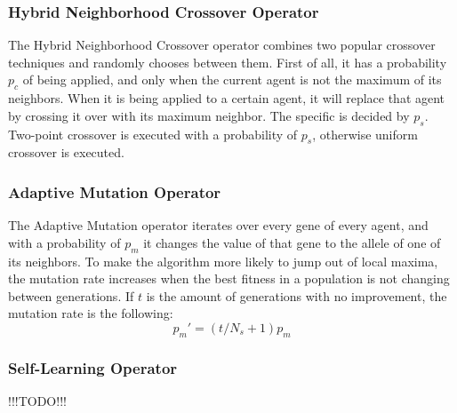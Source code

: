 \subsubsection{Hybrid Neighborhood Crossover Operator}
The Hybrid Neighborhood Crossover operator combines two popular crossover techniques and randomly chooses between them. First of all, it has a probability $p_c$ of being applied, and only when the current agent is not the maximum of its neighbors. When it is being applied to a certain agent, it will replace that agent by crossing it over with its maximum neighbor. The specific is decided by $p_s$. Two-point crossover is executed with a probability of $p_s$, otherwise uniform crossover is executed.
\subsubsection{Adaptive Mutation Operator}
The Adaptive Mutation operator iterates over every gene of every agent, and with a probability of $p_m$ it changes the value of that gene to the allele of one of its neighbors. To make the algorithm more likely to jump out of local maxima, the mutation rate increases when the best fitness in a population is not changing between generations. If $t$ is the amount of generations with no improvement, the mutation rate is the following:
\begin{equation}
p_{m}' = ( t / N_s + 1)p_m
\end{equation}
\subsubsection{Self-Learning Operator}
!!!TODO!!!


